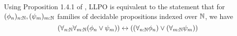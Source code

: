 \begin{remark}\label{corAlternativeLLPO}
  Using Proposition 1.4.1 of \cite{HannesDiener}, LLPO is equivalent to the statement that 
  for $(\phi_n)_{n:\mathbb{N}}, (\psi_m)_{m:\mathbb{N}}$ families of decidable propositions indexed over $\mathbb{N}$, we have
  \begin{equation}
    (\forall_{n:\mathbb{N}} \forall_{m:\mathbb{N}} (\phi_n \vee \psi_m) )
    \leftrightarrow
    ((\forall_{n:\mathbb{N}} \phi_n) \vee (\forall_{m:\mathbb{N}} \psi_m) )
  \end{equation}
\end{remark}


%
%
%
